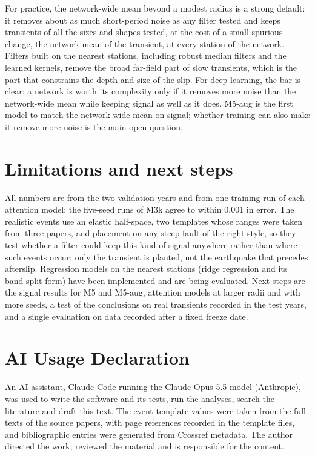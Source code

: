 \documentclass[11pt,a4paper]{article}
\begin{document}
For practice, the network-wide mean beyond a modest radius is a strong default: it removes about as much short-period noise as any filter tested and keeps transients of all the sizes and shapes tested, at the cost of a small spurious change, the network mean of the transient, at every station of the network. Filters built on the nearest stations, including robust median filters and the learned kernels, remove the broad far-field part of slow transients, which is the part that constrains the depth and size of the slip. For deep learning, the bar is clear: a network is worth its complexity only if it removes more noise than the network-wide mean while keeping signal as well as it does. M5-aug is the first model to match the network-wide mean on signal; whether training can also make it remove more noise is the main open question.

\section{Limitations and next steps}

All numbers are from the two validation years and from one training run of each attention model; the five-seed runs of M3k agree to within 0.001 in error. The realistic events use an elastic half-space, two templates whose ranges were taken from three papers, and placement on any steep fault of the right style, so they test whether a filter could keep this kind of signal anywhere rather than where such events occur; only the transient is planted, not the earthquake that precedes afterslip. Regression models on the nearest stations (ridge regression and its band-split form) have been implemented and are being evaluated. Next steps are the signal results for M5 and M5-aug, attention models at larger radii and with more seeds, a test of the conclusions on real transients recorded in the test years, and a single evaluation on data recorded after a fixed freeze date.

\section*{AI Usage Declaration}

An AI assistant, Claude Code running the Claude Opus 5.5 model (Anthropic), was used to write the software and its tests, run the analyses, search the literature and draft this text. The event-template values were taken from the full texts of the source papers, with page references recorded in the template files, and bibliographic entries were generated from Crossref metadata. The author directed the work, reviewed the material and is responsible for the content.



\end{document}
